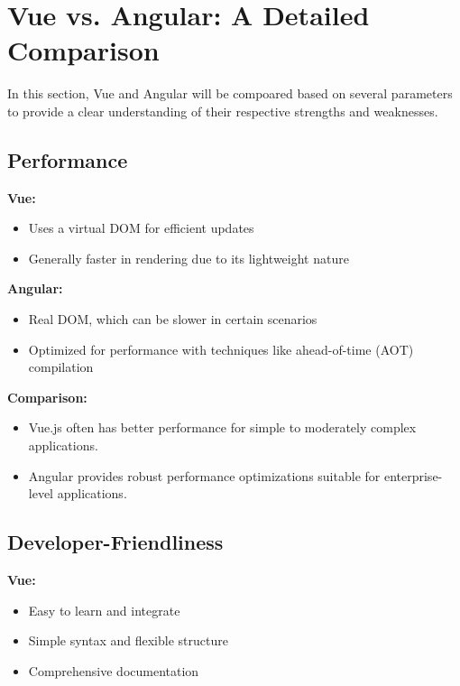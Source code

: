 
\section{Vue vs. Angular: A Detailed Comparison}

In this section, Vue and Angular will be compoared based on several parameters to provide a clear understanding of their respective strengths and weaknesses.

\subsection{Performance}

\textbf{Vue:}
\begin{itemize}
    \item Uses a virtual DOM for efficient updates
    \item Generally faster in rendering due to its lightweight nature
\end{itemize}

\textbf{Angular:}
\begin{itemize}
    \item Real DOM, which can be slower in certain scenarios
    \item Optimized for performance with techniques like ahead-of-time (AOT) compilation
\end{itemize}

\textbf{Comparison:}
\begin{itemize}
    \item Vue.js often has better performance for simple to moderately complex applications.
    \item Angular provides robust performance optimizations suitable for enterprise-level applications.
\end{itemize}

\subsection{Developer-Friendliness}

\textbf{Vue:}
\begin{itemize}
    \item Easy to learn and integrate
    \item Simple syntax and flexible structure
    \item Comprehensive documentation
\end{itemize}

